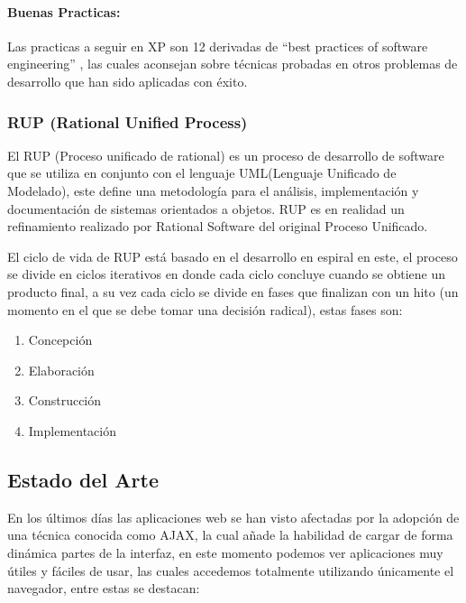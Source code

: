 \paragraph{Buenas Practicas:} Las practicas a seguir en XP son 12 \cite{xp_practices} derivadas de ``best practices of software engineering'' \cite{best_practices}, las cuales aconsejan sobre técnicas probadas en otros problemas de desarrollo que han sido aplicadas con éxito.


\subsubsection*{RUP (Rational Unified Process) \cite{rup}}

El RUP (Proceso unificado de rational) es un proceso de desarrollo de software que se utiliza en conjunto con el lenguaje UML(Lenguaje Unificado de Modelado), este define una metodología para el análisis, implementación y documentación de sistemas orientados a objetos. RUP es en realidad un refinamiento realizado por Rational Software del original Proceso Unificado.

El ciclo de vida de RUP está basado en el desarrollo en espiral en este, el proceso se divide en ciclos iterativos en donde cada ciclo concluye cuando se obtiene un producto final, a su vez cada ciclo se divide en fases que finalizan con un hito (un momento en el que se debe tomar una decisión radical), estas fases son: 

\begin{enumerate}

	\item Concepción
	\item Elaboración
	\item Construcción
	\item Implementación

\end{enumerate}


\subsection{Estado del Arte}

En los últimos días las aplicaciones web se han visto afectadas por la adopción de una técnica conocida como AJAX, la cual añade la habilidad de cargar de forma dinámica partes de la interfaz, en este momento podemos ver aplicaciones muy útiles y fáciles de usar, las cuales accedemos totalmente utilizando únicamente el navegador, entre estas se destacan:


